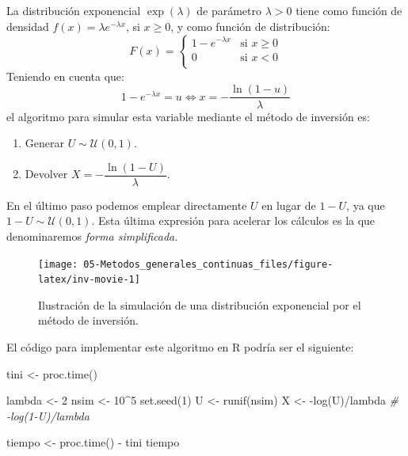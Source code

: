 \documentclass[
]{book}
\newenvironment{Shaded}{\begin{snugshade}}{\end{snugshade}}
\newcommand{\CommentTok}[1]{\textcolor[rgb]{0.56,0.35,0.01}{\textit{#1}}}
\newcommand{\DecValTok}[1]{\textcolor[rgb]{0.00,0.00,0.81}{#1}}
\newcommand{\FunctionTok}[1]{\textcolor[rgb]{0.00,0.00,0.00}{#1}}
\newcommand{\NormalTok}[1]{#1}
\newcommand{\OtherTok}[1]{\textcolor[rgb]{0.56,0.35,0.01}{#1}}
\newcommand{\SpecialCharTok}[1]{\textcolor[rgb]{0.00,0.00,0.00}{#1}}
\theoremstyle{break}
\theoremstyle{definition}
\theoremstyle{definition}
\theoremstyle{definition}
\theoremstyle{definition}
\theoremstyle{remark}
\begin{document}
La distribución exponencial \(\exp \left( \lambda \right)\) de parámetro \(\lambda>0\)
tiene como función de densidad \(f(x) =\lambda e^{-\lambda x}\), si \(x\geq 0\),
y como función de distribución:
\[F(x)=\left\{ \begin{array}{ll}
1-e^{-\lambda x} & \text{si } x \ge 0 \\
0 & \text{si } x < 0\\
\end{array} \right.\]
Teniendo en cuenta que:
\[1-e^{-\lambda x}=u \Leftrightarrow x=-\frac{\ln \left( 1-u\right) }{ \lambda }\]
el algoritmo para simular esta variable mediante el método de inversión es:

\begin{enumerate}
\def\labelenumi{\arabic{enumi}.}
\item
  Generar \(U \sim \mathcal{U}(0, 1)\).
\item
  Devolver \(X=-\dfrac{\ln \left( 1-U\right) }{\lambda }\).
\end{enumerate}

En el último paso podemos emplear directamente \(U\) en lugar de \(1-U\), ya que \(1 - U \sim \mathcal{U}(0, 1)\).
Esta última expresión para acelerar los cálculos es la que denominaremos \emph{forma simplificada}.

\begin{figure}[!htb]

{\centering \texttt{[image: 05-Metodos\_generales\_continuas\_files/figure-latex/inv-movie-1]} 

}

\caption{Ilustración de la simulación de una distribución exponencial por el método de inversión.}\label{fig:inv-movie}
\end{figure}

El código para implementar este algoritmo en R podría ser el siguiente:

\begin{Shaded}
\begin{Highlighting}[]
\NormalTok{tini }\OtherTok{\textless{}{-}} \FunctionTok{proc.time}\NormalTok{()}

\NormalTok{lambda }\OtherTok{\textless{}{-}} \DecValTok{2}
\NormalTok{nsim }\OtherTok{\textless{}{-}} \DecValTok{10}\SpecialCharTok{\^{}}\DecValTok{5}
\FunctionTok{set.seed}\NormalTok{(}\DecValTok{1}\NormalTok{)}
\NormalTok{U }\OtherTok{\textless{}{-}} \FunctionTok{runif}\NormalTok{(nsim)}
\NormalTok{X }\OtherTok{\textless{}{-}} \SpecialCharTok{{-}}\FunctionTok{log}\NormalTok{(U)}\SpecialCharTok{/}\NormalTok{lambda }\CommentTok{\# {-}log(1{-}U)/lambda}

\NormalTok{tiempo }\OtherTok{\textless{}{-}} \FunctionTok{proc.time}\NormalTok{() }\SpecialCharTok{{-}}\NormalTok{ tini}
\NormalTok{tiempo}
\end{Highlighting}
\end{Shaded}
\end{document}
